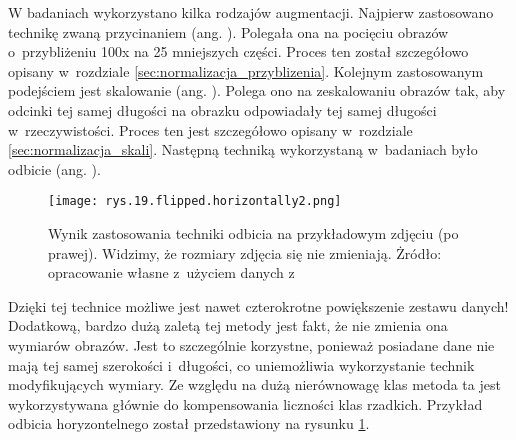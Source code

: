 W badaniach wykorzystano kilka rodzajów augmentacji. Najpierw zastosowano technikę zwaną przycinaniem (ang. ). Polegała ona na pocięciu obrazów o~przybliżeniu 100x na 25 mniejszych części. Proces ten został szczegółowo opisany w~rozdziale \ref{sec:normalizacja_przyblizenia}. Kolejnym zastosowanym podejściem jest skalowanie (ang. ).  Polega ono na zeskalowaniu obrazów tak, aby odcinki tej samej długości na obrazku odpowiadały tej samej długości w~rzeczywistości. Proces ten jest szczegółowo opisany w~rozdziale \ref{sec:normalizacja_skali}. Następną techniką wykorzystaną w~badaniach było odbicie (ang. ).
\begin{figure}[h]
    \centering
    \texttt{[image: rys.19.flipped.horizontally2.png]}
    \caption{Wynik zastosowania techniki odbicia na przykładowym zdjęciu (po prawej). Widzimy, że rozmiary zdjęcia się nie zmieniają.  Żródło: opracowanie własne z~użyciem danych z~\cite{Pirowski17}}
    \label{fig:mesh19}
\end{figure}
Dzięki tej technice możliwe jest nawet czterokrotne powiększenie zestawu danych! Dodatkową, bardzo dużą zaletą tej metody jest fakt, że nie zmienia ona wymiarów obrazów. Jest to szczególnie korzystne, ponieważ posiadane  dane nie mają tej samej szerokości i~długości, co uniemożliwia wykorzystanie technik modyfikujących wymiary. Ze względu na dużą nierównowagę klas metoda ta jest wykorzystywana głównie do kompensowania liczności klas rzadkich. Przykład odbicia horyzontelnego został przedstawiony na rysunku \ref{fig:mesh19}.















